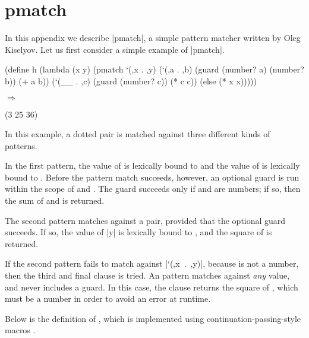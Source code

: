 \chapter{{\bf pmatch}}\label{pmatch}

In this appendix we describe \scheme|pmatch|, a simple pattern
matcher written by Oleg Kiselyov.
Let us first consider a simple example of \scheme|pmatch|.  

\schemedisplayspace
\begin{schemedisplay}
(define h
  (lambda (x y)
    (pmatch `(,x . ,y)
      (`(,a . ,b) (guard (number? a) (number? b)) (+ a b))
      (`(__ . ,c) (guard (number? c)) (* c c))
      (else (* x x)))))
\end{schemedisplay}

\noindent{} $\Rightarrow$ \begin{schemeresponsebox}(3 25 36)\end{schemeresponsebox}

\wspace

\noindent
In this example, a dotted pair is matched against three
different kinds of patterns.

In the first pattern, the value of  is
lexically bound to  and the value of  is lexically bound to
.  Before the pattern match succeeds, however, an
optional guard is run within the scope of  and .  
The guard succeeds only if  and  are numbers; 
if so, then the sum of  and  is returned.  

The second pattern matches against a pair, 
provided that the optional guard succeeds.
If so, the value of \mbox{\scheme|y|} is lexically bound
to , and the square of  is returned.

If the second pattern fails to match against \mbox{\scheme|`(,x . ,y)|},
because  is not a number, then the third and final clause is tried.
An  pattern matches against \emph{any} value, and never includes a guard.
In this case, the clause returns the square of , which must be
a number in order to avoid an error at runtime.

Below is the definition of , which is implemented using
continuation-passing-style macros \cite{oai:CiteSeerPSU:392916}.

\newpage

